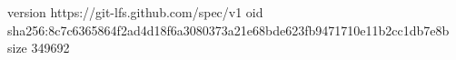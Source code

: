 version https://git-lfs.github.com/spec/v1
oid sha256:8c7c6365864f2ad4d18f6a3080373a21e68bde623fb9471710e11b2cc1db7e8b
size 349692
